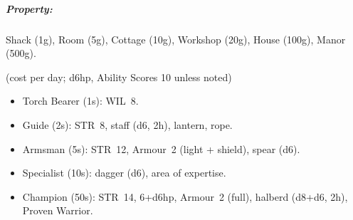\documentclass[itdr/core]{subfiles}
\begin{document}
\subparagraph{Property:} Shack (1g), Room (5g), Cottage (10g), Workshop (20g), House (100g), Manor (500g).


 (cost per day; d6hp, Ability Scores 10
unless noted)

\begin{itemize}
	\item Torch Bearer (1s): WIL~8.
	\item Guide (2s): STR~8, staff (d6, 2h), lantern, rope.
	\item Armsman (5s): STR~12, Armour~2 (light + shield), spear (d6).
	\item Specialist (10s): dagger (d6), area of expertise.
	\item Champion (50s): STR~14, 6+d6hp, Armour~2 (full), halberd (d8+d6, 2h), Proven Warrior.
\end{itemize}


\end{document}
